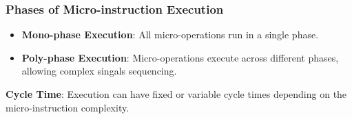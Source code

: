 \begin{frame}
    \frametitle{Phases of Micro-instruction Execution}
    \begin{itemize}
        \item \textbf{Mono-phase Execution}: All micro-operations run in a single phase.
        \item \textbf{Poly-phase Execution}: Micro-operations execute across different phases, allowing complex singals sequencing.
    \end{itemize}
    \textbf{Cycle Time}: Execution can have fixed or variable cycle times depending on the micro-instruction complexity.
\end{frame}

